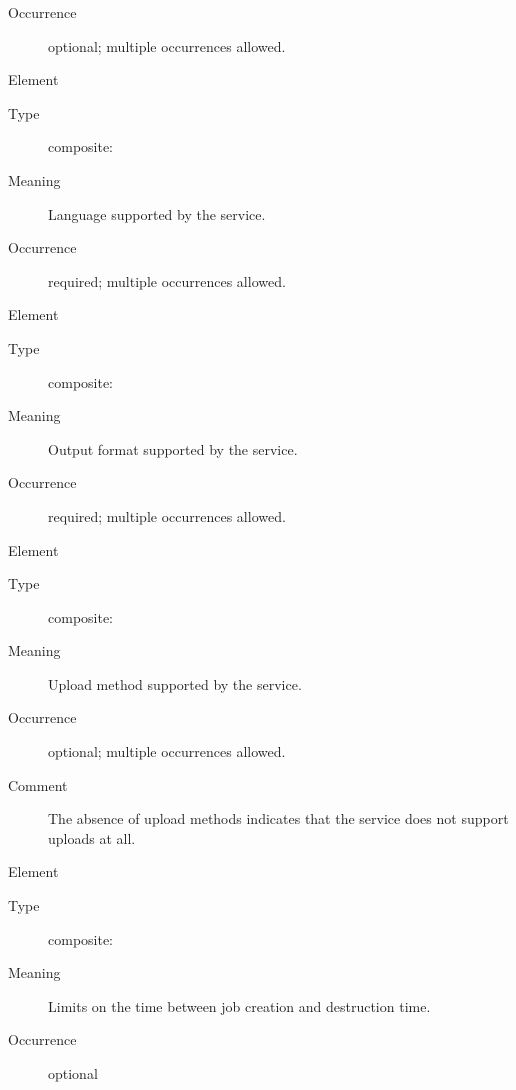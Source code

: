 \documentclass{ivoa}
\begin{document}
\begin{generated}
\begin{bigdescription}
\begin{description}
\item[Occurrence] optional; multiple occurrences allowed.

\end{description}
\item[Element \xmlel{language}]
\begin{description}
\item[Type] composite: 
\item[Meaning] 
              Language supported by the service.
              
\item[Occurrence] required; multiple occurrences allowed.

\end{description}
\item[Element \xmlel{outputFormat}]
\begin{description}
\item[Type] composite: 
\item[Meaning] 
                Output format supported by the service.
              
\item[Occurrence] required; multiple occurrences allowed.

\end{description}
\item[Element \xmlel{uploadMethod}]
\begin{description}
\item[Type] composite: 
\item[Meaning] 
                Upload method supported by the service.
              
\item[Occurrence] optional; multiple occurrences allowed.
\item[Comment] 
                The absence of upload methods indicates
                that the service does not support uploads
                at all.
              

\end{description}
\item[Element \xmlel{retentionPeriod}]
\begin{description}
\item[Type] composite: 
\item[Meaning] 
              Limits on the time between job creation and
              destruction time.
              
\item[Occurrence] optional


\end{description}
\end{bigdescription}
\end{generated}
\end{document}
